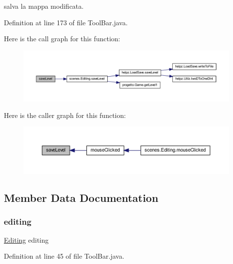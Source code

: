 salva la mappa modificata. 



Definition at line 173 of file Tool\+Bar.\+java.

Here is the call graph for this function\+:\nopagebreak
\begin{figure}[H]
\begin{center}
\leavevmode
\includegraphics[width=350pt]{classui_1_1_tool_bar_af1c1bf274cd89c18726a992a073a7c6d_cgraph}
\end{center}
\end{figure}
Here is the caller graph for this function\+:\nopagebreak
\begin{figure}[H]
\begin{center}
\leavevmode
\includegraphics[width=350pt]{classui_1_1_tool_bar_af1c1bf274cd89c18726a992a073a7c6d_icgraph}
\end{center}
\end{figure}


\subsection{Member Data Documentation}
\mbox{\label{classui_1_1_tool_bar_a38f9dcf960197192269b03c788903b3e}} 
\subsubsection{\texorpdfstring{editing}{editing}}
{\footnotesize\ttfamily \hyperlink{classscenes_1_1_editing}{Editing} editing\hspace{0.3cm}{\ttfamily [private]}}



Definition at line 45 of file Tool\+Bar.\+java.

